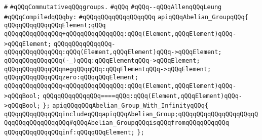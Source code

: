 \label{src/lib/graph/group.api}
\verb|#|\newline
\verb|#qQQqCommutativeqQQqgroups.|\newline
\verb|#qQQq|\newline
\verb|#qQQq--qQQqAllenqQQqLeung|\newline
\newline
\verb|#qQQqCompiledqQQqby:|\newline
\verb|#qQQqqQQqqQQqqQQqqQQq|\newline
\newline
\verb|apiqQQqAbelian_GroupqQQq{|\newline
\newline
\verb|qQQqqQQqqQQqqQQqElement;qQQq|\newline
\newline
\verb|qQQqqQQqqQQqqQQq+qQQqqQQqqQQqqQQq:qQQq(Element,qQQqElement)qQQq->qQQqElement;|\newline
\verb|qQQqqQQqqQQqqQQq-qQQqqQQqqQQqqQQq:qQQq(Element,qQQqElement)qQQq->qQQqElement;|\newline
\verb|qQQqqQQqqQQqqQQq(-_)qQQq:qQQqElementqQQq->qQQqElement;|\newline
\verb|qQQqqQQqqQQqqQQqnegqQQqqQQq:qQQqElementqQQq->qQQqElement;|\newline
\newline
\verb|qQQqqQQqqQQqqQQqzero:qQQqqQQqElement;|\newline
\newline
\verb|qQQqqQQqqQQqqQQq<qQQqqQQqqQQqqQQq:qQQq(Element,qQQqElement)qQQq->qQQqBool;|\newline
\verb|qQQqqQQqqQQqqQQq====qQQq:qQQq(Element,qQQqElement)qQQq->qQQqBool;|\newline
\verb|};|\newline
\newline
\verb|apiqQQqqQQqAbelian_Group_With_InfinityqQQq{|\newline
\newline
\verb|qQQqqQQqqQQqqQQqincludeqQQqapiqQQqAbelian_Group;qQQqqQQqqQQqqQQqqQQqqQQqqQQqqQQqqQQqqQQq#qQQqAbelian_GroupqQQqisqQQqfromqQQqqQQqqQQq|\newline
\newline
\verb|qQQqqQQqqQQqqQQqinf:qQQqqQQqElement;|\newline
\verb|};|\newline

